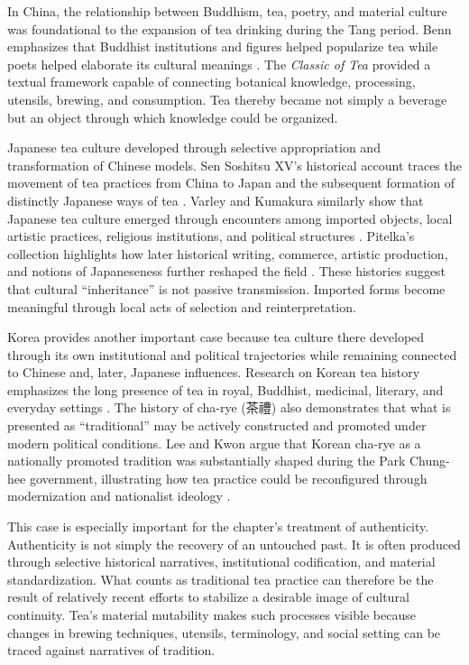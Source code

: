 \documentclass[numbers]{IntechOpen-Book}
\newcommand{\zh}[1]{{\CJKfontspec{Noto Serif CJK SC}\upshape #1}}
\begin{document}
In China, the relationship between Buddhism, tea, poetry, and material culture was foundational to the expansion of tea drinking during the Tang period. Benn emphasizes that Buddhist institutions and figures helped popularize tea while poets helped elaborate its cultural meanings \cite{benn,bennpoetry}. The \textit{Classic of Tea} provided a textual framework capable of connecting botanical knowledge, processing, utensils, brewing, and consumption. Tea thereby became not simply a beverage but an object through which knowledge could be organized.

Japanese tea culture developed through selective appropriation and transformation of Chinese models. Sen Soshitsu XV's historical account traces the movement of tea practices from China to Japan and the subsequent formation of distinctly Japanese ways of tea \cite{sen}. Varley and Kumakura similarly show that Japanese tea culture emerged through encounters among imported objects, local artistic practices, religious institutions, and political structures \cite{varley}. Pitelka's collection highlights how later historical writing, commerce, artistic production, and notions of Japaneseness further reshaped the field \cite{pitelka}. These histories suggest that cultural ``inheritance'' is not passive transmission. Imported forms become meaningful through local acts of selection and reinterpretation.

Korea provides another important case because tea culture there developed through its own institutional and political trajectories while remaining connected to Chinese and, later, Japanese influences. Research on Korean tea history emphasizes the long presence of tea in royal, Buddhist, medicinal, literary, and everyday settings \cite{leekwon}. The history of cha-rye (\zh{茶禮}) also demonstrates that what is presented as ``traditional'' may be actively constructed and promoted under modern political conditions. Lee and Kwon argue that Korean cha-rye as a nationally promoted tradition was substantially shaped during the Park Chung-hee government, illustrating how tea practice could be reconfigured through modernization and nationalist ideology \cite{leekwon}.

This case is especially important for the chapter's treatment of authenticity. Authenticity is not simply the recovery of an untouched past. It is often produced through selective historical narratives, institutional codification, and material standardization. What counts as traditional tea practice can therefore be the result of relatively recent efforts to stabilize a desirable image of cultural continuity. Tea's material mutability makes such processes visible because changes in brewing techniques, utensils, terminology, and social setting can be traced against narratives of tradition.
\end{document}
